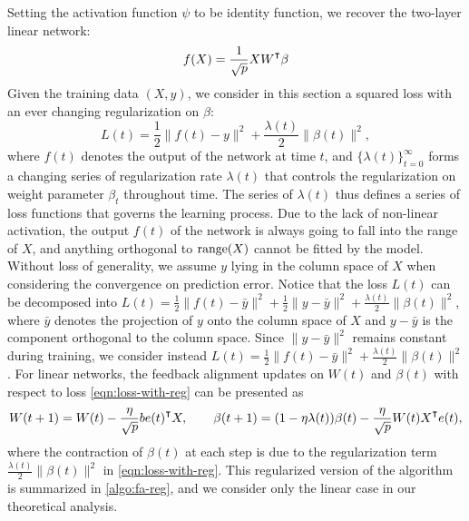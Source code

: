 Setting the activation function $\psi$ to be identity function, we recover the two-layer linear network: 
\begin{align}\label{eqn:linear-network}
    f(X) = \frac{1}{\sqrt p}XW\transpose\beta
\end{align}
Given the training data $(X,y)$, we consider in this section a squared loss with an ever changing regularization on $\beta$:
\begin{equation}\label{eqn:loss-with-reg}
    L(t) = \frac{1}{2}\|f(t) - y\|^2 + \frac{\lambda(t)}{2}\|\beta(t)\|^2,
\end{equation}
where $f(t)$ denotes the output of the network at time $t$, and $\{\lambda(t)\}_{t=0}^\infty$ forms a changing series of regularization rate $\lambda(t)$ that controls the regularization on weight parameter $\beta_t$ throughout time. The series of $\lambda(t)$ thus defines a series of loss functions that governs the learning process. Due to the lack of non-linear activation, the output $f(t)$ of the network is always going to fall into the range of $X$, and anything orthogonal to $\operatorname{\mathrm{range}}(X)$ cannot be fitted by the model. Without loss of generality, we assume $y$ lying in the column space of $X$ when considering the convergence on prediction error.
Notice that the loss $L(t)$ can be decomposed into $L(t) = \frac{1}{2}\|f(t) - \bar y\|^2 + \frac{1}{2}\|y - \bar y\|^2 + \frac{\lambda(t)}{2}\|\beta(t)\|^2$, where $\bar y$ denotes the projection of $y$ onto the column space of $X$ and $y-\bar y$ is the component orthogonal to the column space. Since $\|y - \bar y\|^2$ remains constant during training, we consider instead $L(t) = \frac{1}{2}\|f(t) - \bar y\|^2 + \frac{\lambda(t)}{2}\|\beta(t)\|^2$.
For linear networks, the feedback alignment updates on $W(t)$ and $\beta(t)$ with respect to loss \eqref{eqn:loss-with-reg} can be presented as
\begin{align}\label{eqn:update-reg}
    W(t+1) = W(t) - \frac{\eta}{\sqrt p}b e(t)\transpose X, \qquad \beta(t+1) = (1-\eta\lambda(t))\beta(t) - \frac{\eta}{\sqrt p} W(t)X\transpose e(t), 
\end{align}
where the contraction of $\beta(t)$ at each step is due to the regularization term $\frac{\lambda(t)}{2}\|\beta(t)\|^2$ in \eqref{eqn:loss-with-reg}. This regularized version of the algorithm is summarized in \cref{algo:fa-reg}, and we consider only the linear case in our theoretical analysis.

